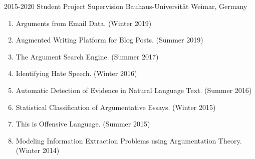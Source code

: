 \cvevent
{2015-2020} %
{Student Project Supervision} %
{Bauhaus-Universität Weimar, Germany} %

\begin{enumerate}
\item Arguments from Email Data. (Winter 2019)
\item Augmented Writing Platform for Blog Posts. (Summer 2019)
\item The Argument Search Engine.  (Summer 2017)
\item Identifying Hate Speech. (Winter 2016)
\item Automatic Detection of Evidence in Natural Language Text. (Summer 2016)
\item Statistical Classification of Argumentative Essays. (Winter 2015)
\item This is Offensive Language. (Summer 2015)
\item Modeling Information Extraction Problems using Argumentation Theory. (Winter 2014)
\end{enumerate}